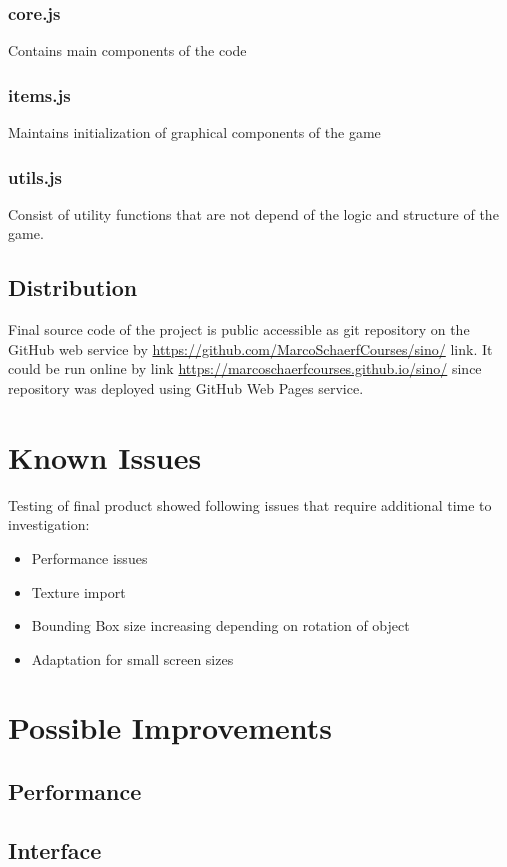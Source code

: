 \documentclass[12pt]{article}
\begin{document}
\subsubsection{core.js}
Contains main components of the code
\subsubsection{items.js}
Maintains initialization of graphical components of the game
\subsubsection{utils.js}
Consist of utility functions that are not depend of the logic and structure of the game.
\subsection{Distribution}
Final source code of the project is public accessible as git repository on the GitHub web service by \url{https://github.com/MarcoSchaerfCourses/sino/} link. It could be run online by link \url{https://marcoschaerfcourses.github.io/sino/} since repository was deployed using GitHub Web Pages service.
\newpage
\section{Known Issues}
Testing of final product showed following issues that require additional time to investigation:
\begin{itemize}
\item Performance issues
\item Texture import
\item Bounding Box size increasing depending on rotation of object
\item Adaptation for small screen sizes
\end{itemize}

\newpage
\section{Possible Improvements}
\subsection{Performance}
\subsection{Interface}


\newpage


\end{document}
